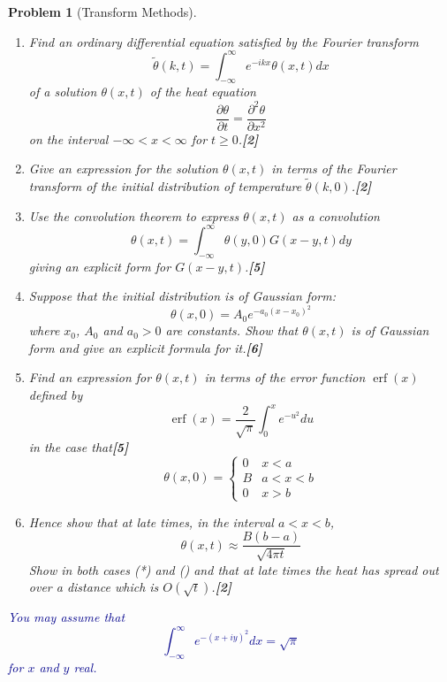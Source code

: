 \documentclass[a4paper]{article}
\DeclareMathOperator{\erf}{erf}
\theoremstyle{new}
\newtheorem{qns}{Problem}[section]
\begin{document}
\begin{qns}[Transform Methods]\leavevmode
\begin{enumerate}[label=(\roman*)]
    \item Find an ordinary differential equation satisfied by the Fourier transform
$$\tilde{\theta}(k,t)=\int_{-\infty}^\infty e^{-ikx}\theta(x,t)dx$$
of a solution $\theta(x,t)$ of the heat equation
$$\frac{\partial\theta}{\partial t}=\frac{\partial^2\theta}{\partial x^2}$$
on the interval $-\infty < x <\infty$ for $t\geq0$.\hfill\textbf{[2]}
\item Give an expression for the solution $\theta(x, t)$ in terms of the Fourier transform of the initial distribution of temperature $\tilde{\theta}(k,0)$.\hfill\textbf{[2]}
\item Use the convolution theorem to express $\theta(x, t)$ as a convolution
$$\theta(x,t)=\int_{-\infty}^\infty\theta(y,0)G(x-y,t)dy$$
giving an explicit form for $G(x − y, t)$.\hfill\textbf{[5]}
\item Suppose that the initial distribution is of Gaussian form:
\begin{equation}
    \theta(x,0)=A_0e^{-a_0(x-x_0)^2}\tag{*}
\end{equation}
where $x_0$, $A_0$ and $a_0 > 0$ are constants. Show that $\theta(x, t)$ is of Gaussian form and give an explicit formula for it.\hfill\textbf{[6]}
\item Find an expression for $\theta(x, t)$ in terms of the error function $\erf(x)$ defined by
$$\erf(x)=\frac{2}{\sqrt{\pi}}\int_0^xe^{-u^2}du$$
in the case that\hfill\textbf{[5]}
\begin{equation}
  \theta(x,0)=
\left\{
        \begin{array}{ll}
      0 & x<a \\
      B & a<x<b\\
      0& x>b
        \end{array}
    \right.\tag{\dag}  
\end{equation}
\item Hence show that at late times, in the interval $a<x<b$,
$$\theta(x,t)\approx\frac{B(b-a)}{\sqrt{4\pi t}}$$
Show in both cases (*) and (\dag) and that at late times the heat has spread out over a distance which is $O(\sqrt{t})$.\hfill\textbf{[2]}
\end{enumerate}
\begin{mdframed}
\textcolor{darkblue}{You may assume that
$$\int_{-\infty}^\infty e^{-(x+iy)^2}dx=\sqrt{\pi}$$
for $x$ and $y$ real.}
\end{mdframed}
\end{qns}
\end{document}
